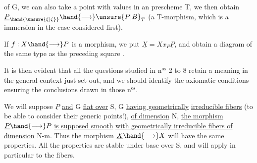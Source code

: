 of G, we can also take a point with values in an prescheme T,
we then obtain $\underline{P}_{\hand{\unsure{\xi|\zeta}}} \hand{\longrightarrow} \unsure{P|B}_T$ (a T-morphism, which is a  immersion
in the case considered first).

If $f:X \hand{\longrightarrow} P$ is a morphism, we put $\underline{X} = Xx_P\underline{P}$, and obtain
a diagram of the same type as the preceding square
.

It is then evident that all the questions studied in n$^{\text{os}}$ 2 to 8
retain a meaning in the general context just set out, and we should
identify the axiomatic conditions ensuring the conclusions
drawn in those n$^{\text{os}}$.

We will suppose $\underline{P}$ \uline{and} G \uline{flat over} S, G \uline{having geometrically}
\uline{irreducible fibers} (to be able to consider their generic
points!), \uline{of dimension} N, \uline{the morphism} $\underline{P} \hand{\longrightarrow} P$ \uline{is supposed smooth}
\uline{with geometrically irreducible fibers of dimension} N-m. Thus the
morphism $\underline{X} \hand{\longrightarrow} X$ will have the same properties. All the properties
  are stable under base  over S, and will apply
in particular to the fibers.

